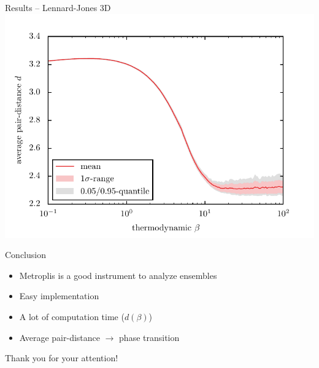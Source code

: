 \documentclass[mathserif,serif]{beamer}
\begin{document}
\begin{frame}{Results -- Lennard-Jones 3D}
	\pause
	\centering
	\includegraphics[width=\textwidth]{../report/figures/temp_dep_lennard_jones3d.pdf}
\end{frame}



\begin{frame}{Conclusion}
	\begin{itemize}
		\setlength{\itemsep}{1.5em}
		\item Metroplis is a good instrument to analyze ensembles
		\item Easy implementation
		\item A lot of computation time ($d(\beta)$)
		\item Average pair-distance $\rightarrow$ phase transition
	\end{itemize}
	\vspace{2em}
	\centering
	Thank you for your attention!
\end{frame}
\end{document}
